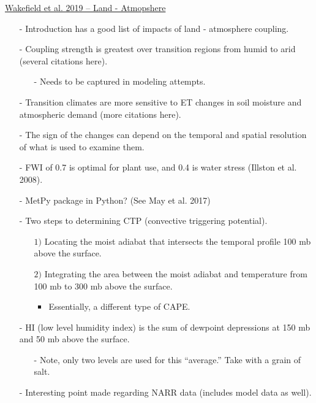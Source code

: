 \documentclass[12pt, letterpaper]{article}
\begin{document}
    \underline{Wakefield et al. 2019 -- Land - Atmopshere}
    \begin{itemize}
    	\item[-] Introduction has a good list of impacts of land - atmosphere coupling.
    	\item[-] Coupling strength is greatest over transition regions from humid to arid (several
    	         citations here).
    	\begin{itemize}
    		\item[-] Needs to be captured in modeling attempts.
    	\end{itemize}
        \item[-] Transition climates are more sensitive to ET changes in soil moisture and atmospheric
                 demand (more citations here).
        \item[-] The sign of the changes can depend on the temporal and spatial resolution of what is
                 used to examine them.
        \item[-] FWI of 0.7 is optimal for plant use, and 0.4 is water stress (Illston et al. 2008).
        \item[-] MetPy package in Python? (See May et al. 2017)
        \item[-] Two steps to determining CTP (convective triggering potential).
        \begin{itemize}
        	\item[$1)$] Locating the moist adiabat that intersects the temporal profile 100 mb above 
        	            the surface.
        	\item[$2)$] Integrating the area between the moist adiabat and temperature from 100 mb to
        	            300 mb above the surface.
            \begin{itemize}
        	    \item Essentially, a different type of CAPE.
            \end{itemize}
        \end{itemize}
        \item[-] HI (low level humidity index) is the sum of dewpoint depressions at 150 mb and 50 mb
                 above the surface.
        \begin{itemize}
        	\item[-] Note, only two levels are used for this ``average.'' Take with a grain of salt. 
        \end{itemize}
        \item[-] Interesting point made regarding NARR data (includes model data as well).

\end{itemize}
\end{document}

